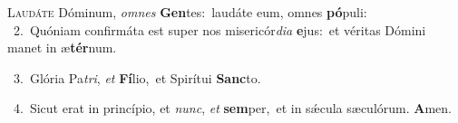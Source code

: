 \lettrine{\initial\textcolor{\initialcolor}{L}}{audáte} Dóminum, \textit{om}\-\textit{nes} \textbf{Gen}\-tes:~\star laudáte eum, omnes \textbf{pó}\-puli:\\
{\numbfont\textcolor{\numbcolor}{~2.}}~Quóniam confirmáta est super nos misericór\-\textit{di}\-\textit{a} \textbf{e}\-jus:~\star et véritas Dómini manet in æ\-\textbf{tér}\-num.\par
{\numbfont\textcolor{\numbcolor}{~3.}}~Glória Pa\-\textit{tri}\-, \textit{et} \textbf{Fí}\-lio,~\star et Spirítui \textbf{Sanc}\-to.\par
{\numbfont\textcolor{\numbcolor}{~4.}}~Sicut erat in princípio, et \textit{nunc}\-, \textit{et} \textbf{sem}\-per,~\star et in sǽcula sæculórum. \textbf{A}\-men.\par
